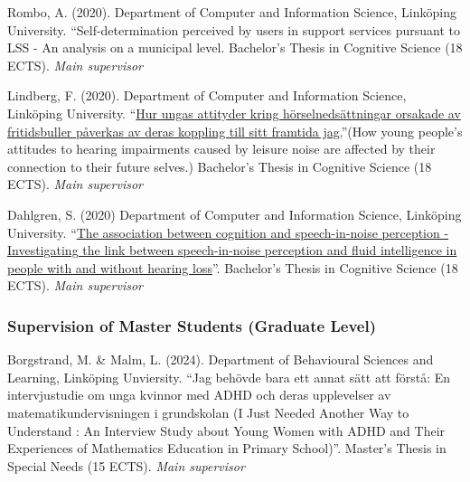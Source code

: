 \documentclass[]{article}
\begin{document}
Rombo, A. (2020). Department of Computer and Information Science,
Linköping University. ``Self-determination perceived by users in support
services pursuant to LSS - An analysis on a municipal level. Bachelor's
Thesis in Cognitive Science (18 ECTS). \emph{Main supervisor}

Lindberg, F. (2020). Department of Computer and Information Science,
Linköping University.
``\href{http://liu.diva-portal.org/smash/record.jsf?dswid=-6296&faces-redirect=true&language=en&searchType=SIMPLE&query=Marsja&af=\%5B\%5D&aq=\%5B\%5B\%5D\%5D&aq2=\%5B\%5B\%5D\%5D&aqe=\%5B\%5D&pid=diva2\%3A1468019&noOfRows=50&sortOrder=author_sort_asc&sortOrder2=title_sort_asc&onlyFullText=false&sf=undergraduate}{Hur
ungas attityder kring hörselnedsättningar orsakade av fritidsbuller
påverkas av deras koppling till sitt framtida jag.}''(How young people's
attitudes to hearing impairments caused by leisure noise are affected by
their connection to their future selves.) Bachelor's Thesis in Cognitive
Science (18 ECTS). \emph{Main supervisor}

Dahlgren, S. (2020) Department of Computer and Information Science,
Linköping University.
``\href{http://liu.diva-portal.org/smash/record.jsf?dswid=-6296&faces-redirect=true&language=en&searchType=SIMPLE&query=Marsja&af=\%5B\%5D&aq=\%5B\%5B\%5D\%5D&aq2=\%5B\%5B\%5D\%5D&aqe=\%5B\%5D&pid=diva2\%3A1443600&noOfRows=50&sortOrder=author_sort_asc&sortOrder2=title_sort_asc&onlyFullText=false&sf=undergraduate}{The
association between cognition and speech-in-noise perception -
Investigating the link between speech-in-noise perception and fluid
intelligence in people with and without hearing loss}''. Bachelor's
Thesis in Cognitive Science (18 ECTS). \emph{Main supervisor}

\subsubsection{Supervision of Master Students (Graduate
Level)}\label{supervision-of-master-students-graduate-level}

Borgstrand, M. \& Malm, L. (2024). Department of Behavioural Sciences
and Learning, Linköping Unviersity. ``Jag behövde bara ett annat sätt
att förstå: En intervjustudie om unga kvinnor med ADHD och deras
upplevelser av matematikundervisningen i grundskolan (I Just Needed
Another Way to Understand : An Interview Study about Young Women with
ADHD and Their Experiences of Mathematics Education in Primary
School)''. Master's Thesis in Special Needs (15 ECTS). \emph{Main
supervisor}
\end{document}
